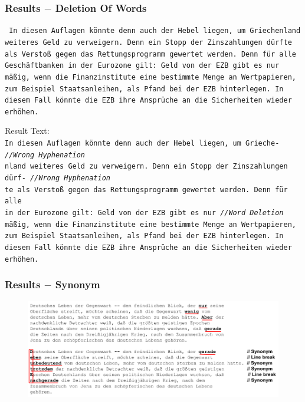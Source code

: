 \documentclass{beamer}
\begin{document}
\begin{frame}
\frametitle{Results $-$ Deletion Of Words}
\texttt{\tiny
In diesen Auflagen könnte denn auch der Hebel liegen, um Griechenland \\
weiteres Geld zu verweigern. Denn ein Stopp der Zinszahlungen dürfte \\
als Verstoß gegen das Rettungsprogramm gewertet werden. Denn für alle \\
Geschäftbanken in der Eurozone gilt: Geld von der EZB gibt es nur \\
mäßig, wenn die Finanzinstitute eine bestimmte Menge an Wertpapieren, \\
zum Beispiel Staatsanleihen, als Pfand bei der EZB hinterlegen. In \\
diesem Fall könnte die EZB ihre Ansprüche an die Sicherheiten wieder \\
erhöhen. \\
}

Result Text: \\

\texttt{\scriptsize{I}\tiny n diesen Auflagen könnte denn auch der Hebel liegen, um Grieche-  \hskip 30pt \emph{//Wrong Hyphenation} \\
\scriptsize{n}\tiny land weiteres Geld zu verweigern. Denn ein Stopp der Zinszahlungen dürf- \emph{//Wrong Hyphenation} \\
\scriptsize{t}\tiny e als Verstoß gegen das Rettungsprogramm gewertet werden. Denn für alle \\
\scriptsize{i}\tiny n der Eurozone gilt: Geld von der EZB gibt es nur \hskip 72pt \emph{//Word Deletion} \\
\scriptsize{m}\tiny äßig, wenn die Finanzinstitute eine bestimmte Menge an Wertpapieren, \\
zum Beispiel Staatsanleihen, als Pfand bei der EZB hinterlegen. In \\
diesem Fall könnte die EZB ihre Ansprüche an die Sicherheiten wieder \\
erhöhen. \\
}
\end{frame}


\begin{frame}
\frametitle{Results $-$ Synonym}
\begin{figure}
\includegraphics[scale=0.35]{beispiel-synonym}
\end{figure}
\end{frame}
\end{document}
